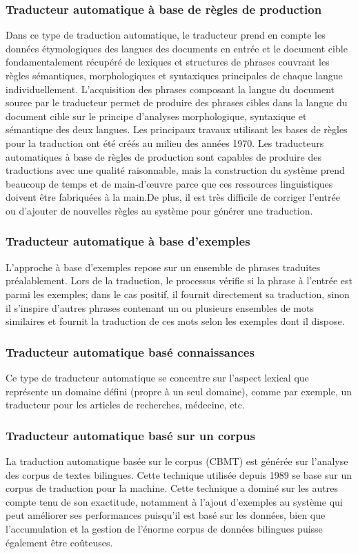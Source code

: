         \subsubsection{Traducteur automatique à base de règles de production}
        Dans ce type de traduction automatique, le traducteur prend en compte les données étymologiques des langues des documents en entrée et le document cible fondamentalement récupéré de 
        lexiques et structures de phrases couvrant les règles sémantiques, morphologiques et syntaxiques principales de chaque langue individuellement. L'acquisition des phrases composant la langue du document source par le traducteur permet de produire des phrases cibles dans la langue du document cible sur le principe d'analyses morphologique, syntaxique et sémantique des deux langues.
        Les principaux travaux utilisant les bases de règles pour la traduction ont été créés au milieu des années 1970\cite{surveyTraduction}.
        Les traducteurs automatiques à base de règles de production sont capables de produire des traductions avec une qualité raisonnable, mais la construction du système prend beaucoup de temps et de main-d'œuvre parce que ces ressources linguistiques doivent être fabriquées à la main.De plus, il est très difficile de corriger l'entrée ou d'ajouter de nouvelles règles au système pour générer une traduction\cite{jean}.
        \subsubsection{Traducteur automatique à base d'exemples}
        L'approche à base d'exemples repose sur un ensemble de phrases traduites préalablement. Lors de la traduction, le processus vérifie si la phrase à l'entrée est parmi les exemples; dans le cas positif, il fournit directement sa traduction, sinon il s'inspire d'autres phrases contenant un ou plusieurs ensembles de mots similaires et fournit la traduction de ces mots selon les exemples dont il dispose\cite{setif}.
        \subsubsection{Traducteur automatique basé connaissances}
        Ce type de traducteur automatique se concentre sur l'aspect lexical que représente un domaine défini (propre à un seul domaine), comme par exemple, un traducteur pour les articles de recherches, médecine, etc\cite{surveyTraduction}.
        \subsubsection{Traducteur automatique basé sur un corpus}
        La traduction automatique basée sur le corpus (CBMT) est générée sur l'analyse des corpus de textes bilingues. Cette technique utilisée depuis 1989 se base sur un corpus de traduction pour la machine. Cette technique a dominé sur les autres compte tenu de son exactitude, notamment à l'ajout d'exemples au système qui peut améliorer ses performances puisqu'il est basé sur les données, bien que l'accumulation et la gestion de l'énorme corpus de données bilingues puisse également être coûteuses\cite{jean}.
